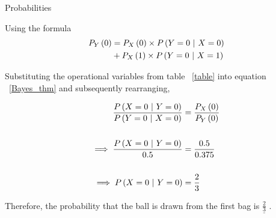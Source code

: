 \documentclass[journal,12pt,twocolumn]{IEEEtran}
\begin{document}
	
	\begin{table}[h!b]
	
		\caption{Probabilities}
		
		
		\label{table}
		
	\end{table}
		
	
	Using the formula
	\begin{align}
		P_{Y}\left(0\right) &= P_{X}\left(0\right) \times P\left(Y = 0\ |\ X = 0\right) \nonumber \\
		&+ P_{X}\left(1\right) \times P\left(Y = 0\ |\ X = 1\right)
			\label{prob_form}
	\end{align}
	
	
	\newpage


	Substituting the operational variables from table ~\ref{table} into equation ~\eqref{Bayes_thm} and subsequently rearranging,
	
	
	\begin{align}
		\frac{P\left(X = 0\ |\ Y = 0\right)}{P\left(Y = 0\ |\ X = 0\right)} &= \frac{P_{X}\left(0\right)}{P_{Y}\left(0\right)} \\
			\nonumber \\
		\implies \frac{P\left(X = 0\ |\ Y = 0\right)}{0.5} &= \frac{0.5}{0.375} \\
			\nonumber \\
		\implies P\left(X = 0\ |\ Y = 0\right) &= \frac{2}{3}
			\label{soln}
	\end{align}
	
	
	Therefore, the probability that the ball is drawn from the first bag is $\underline{\frac{2}{3}}$ .
				
				
\end{document}
